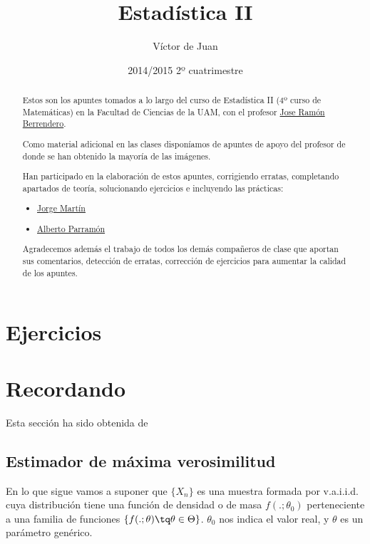 \documentclass[palatino,nochap]{apuntes}
\author{Víctor de Juan}
\date{2014/2015 2º cuatrimestre}
\title{Estadística II}
\begin{document}
\begin{abstract}

Estos son los apuntes tomados a lo largo del curso de Estadística II (4º curso de Matemáticas) en la Facultad de Ciencias de la UAM, con el profesor \href{http://www.uam.es/joser.berrendero}{Jose Ramón Berrendero}. 


Como material adicional en las clases disponíamos de apuntes de apoyo del profesor de donde se han obtenido la mayoría de las imágenes.

Han participado en la elaboración de estos apuntes, corrigiendo erratas, completando apartados de teoría, solucionando ejercicios e incluyendo las prácticas:

\begin{itemize}
     \item \href{https://github.com/MartinPJorge}{Jorge Martín}
     \item \href{https://github.com/AlbertoParramon}{Alberto Parramón}
 \end{itemize}  

Agradecemos además el trabajo de todos los demás compañeros de clase que aportan sus comentarios, detección de erratas, corrección de ejercicios para aumentar la calidad de los apuntes.

\end{abstract}


\pagestyle{plain}
\maketitle

\tableofcontents
\newpage







\appendix
\chapter{Ejercicios}


\chapter{Recordando}
Esta sección ha sido obtenida de \citep{ApuntesEstI}

\section{Estimador de máxima verosimilitud}
\label{sec:estimadorMaximaVerosimilitud}
En lo que sigue vamos a suponer que $\{X_n\}$ es una muestra formada por v.a.i.i.d. cuya distribución tiene una función de densidad o de masa $f(.;\theta_0)$ perteneciente a una familia de funciones $\{f(.;\theta) \tq \theta \in \Theta\}$. $\theta_0$ nos indica el valor real, y $\theta$ es un parámetro genérico.
\end{document}
